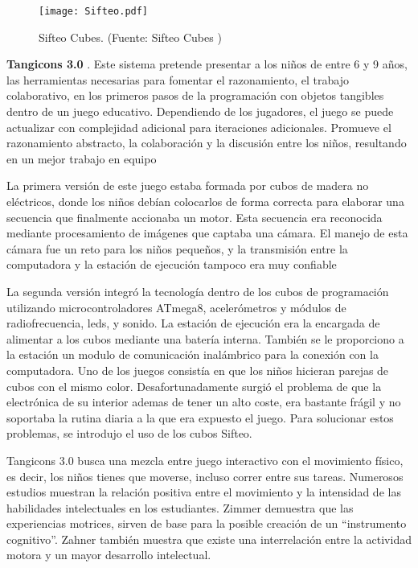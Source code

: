 \begin{figure}[!h]
\begin{center}
\texttt{[image: Sifteo.pdf]}
\caption{Sifteo Cubes. (Fuente: Sifteo Cubes \cite{Merrill})}
\label{fig:Sifteo}
\end{center}
\end{figure}

\textbf{Tangicons 3.0} \cite{Tangicons}. Este sistema pretende presentar a los niños de entre 6 y 9 años, las herramientas necesarias para fomentar el razonamiento, el trabajo colaborativo, en los primeros pasos de la programación con objetos tangibles dentro de un juego educativo. Dependiendo de los jugadores, el juego se puede actualizar con complejidad adicional para iteraciones adicionales. Promueve el razonamiento abstracto, la colaboración y la discusión entre los niños, resultando en un mejor trabajo en equipo

La primera versión de este juego estaba formada por cubos de madera no eléctricos, donde los niños debían colocarlos de forma correcta para elaborar una secuencia que finalmente accionaba un motor. Esta secuencia era reconocida mediante procesamiento de imágenes que captaba una cámara. El manejo de esta cámara fue un reto para los niños pequeños, y la transmisión entre la computadora y la estación de ejecución tampoco era muy confiable

La segunda versión integró la tecnología dentro de los cubos de programación utilizando microcontroladores ATmega8, acelerómetros y módulos de radiofrecuencia, leds, y sonido. La estación de ejecución era la encargada de alimentar a los cubos mediante una batería interna. También se le proporciono a la estación un modulo de comunicación inalámbrico para la conexión con la computadora. Uno de los juegos consistía en que los niños hicieran parejas de cubos con el mismo color. Desafortunadamente surgió el problema de que la electrónica de su interior ademas de tener un alto coste, era bastante frágil y no soportaba la rutina diaria a la que era expuesto el juego. Para solucionar estos problemas, se introdujo el uso de los cubos Sifteo.

Tangicons 3.0 busca una mezcla entre juego interactivo con el movimiento físico, es decir, los niños tienes que moverse, incluso correr entre sus tareas. Numerosos estudios muestran la relación positiva entre el movimiento y la intensidad de las habilidades intelectuales en los estudiantes. Zimmer \cite{Zimmer} demuestra  que las experiencias motrices, sirven de base para la posible creación de un “instrumento cognitivo”. Zahner \cite{Zahner} también muestra que existe una interrelación entre la actividad motora y un mayor desarrollo intelectual.

